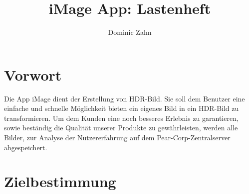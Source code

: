 \documentclass[parskip=full]{scrartcl}
\title{iMage App: Lastenheft}
\author{Dominic Zahn}
\begin{document}
\maketitle

\section{Vorwort}

Die \gls{App} iMage dient der Erstellung von \gls{HDR-Bild}. Sie soll dem Benutzer eine einfache und
schnelle Möglichkeit bieten ein eigenes Bild in ein \gls{HDR-Bild} zu transformieren.
Um dem Kunden eine noch besseres Erlebnis zu garantieren, sowie beständig die Qualität unserer Produkte
zu gewährleisten, werden alle Bilder, zur Analyse der Nutzererfahrung auf dem Pear-Corp-Zentralserver
abgespeichert.

\section{Zielbestimmung}




\printnoidxglossaries
\end{document}
